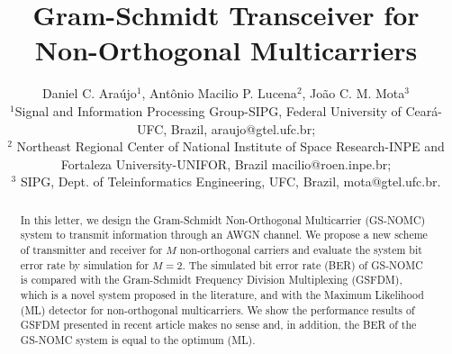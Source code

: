\documentclass[draftcls,12pt, onecolumn, twoside]{IEEEtran}
\begin{document}
%

\title{Gram-Schmidt Transceiver for Non-Orthogonal Multicarriers} 
\vspace{1cm}

\author{Daniel C. Ara\'ujo$^{1}$, Ant\^onio Macilio P. Lucena$^{2}$, Jo\~ao C. M. Mota$^{3}$
\vspace{0.5cm}

\noindent ${}^{1}$Signal and Information Processing Group-SIPG, Federal University of Cear\'a-UFC, Brazil, araujo@gtel.ufc.br;\\
\noindent ${}^{2}$ Northeast Regional Center of
National Institute of Space Research-INPE and Fortaleza University-UNIFOR, Brazil macilio@roen.inpe.br;\\
\noindent ${}^{3}$ SIPG, Dept. of Teleinformatics Engineering, UFC, Brazil, mota@gtel.ufc.br.}


\maketitle

\newpage

	\begin{abstract}
		In this letter, we design the Gram-Schmidt Non-Orthogonal Multicarrier (GS-NOMC) system to transmit information through an AWGN channel. We propose a new scheme of transmitter and receiver for $M$ non-orthogonal carriers and evaluate the system bit error rate by simulation for $M=2$. The simulated bit error rate (BER) of  GS-NOMC is compared with the Gram-Schmidt Frequency Division Multiplexing (GSFDM), which is a novel system proposed in the literature,  and with the Maximum Likelihood (ML) detector for non-orthogonal multicarriers. We show the performance results of GSFDM presented in recent article makes no sense and, in addition, the BER of the GS-NOMC system  is equal to  the optimum (ML).	\end{abstract}
%
\end{document}
